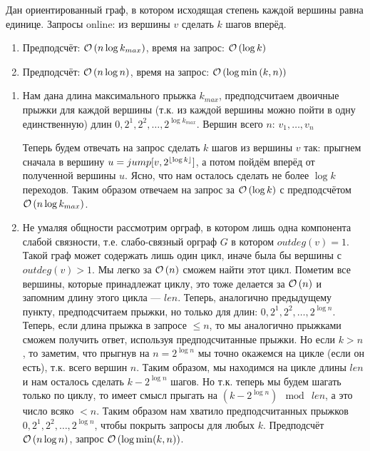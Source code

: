 \begin{task}[2]
Дан ориентированный граф, в котором исходящая степень каждой вершины равна единице. Запросы online: из вершины $v$ сделать $k$ шагов вперёд.
\begin{enumerate}[label=(\alph*)]
	\item Предподсчёт: $\mathcal{O}\left(n\log{k_{max}}\right)$, время на запрос: $\mathcal{O}\left(\log{k}\right)$
	\item Предподсчёт: $\mathcal{O}\left(n\log{n}\right)$, время на запрос: $\mathcal{O}\left(\log{\min{(k,n)}}\right)$
\end{enumerate}
\end{task}
\begin{solution}
\begin{enumerate}[label=(\alph*)]
	\item Нам дана длина максимального прыжка $k_{max}$, предподсчитаем двоичные прыжки для каждой вершины (т.к. из каждой вершины можно пойти в одну единственную) длин $0, 2^1, 2^2, \ldots, 2^{\log{k_{max}}}$. Вершин всего $n$: $v_1, \ldots, v_n$
	\begin{algorithmic}
	\EndFor
		\EndFor
	\EndFor
	\end{algorithmic}
	Теперь будем отвечать на запрос сделать $k$ шагов из вершины $v$ так: прыгнем сначала в вершину $u = jump[v, 2^{\lfloor\log{k}\rfloor}]$, а потом пойдём вперёд от полученной вершины $u$. Ясно, что нам осталось сделать не более $\log{k}$ переходов. Таким образом отвечаем на запрос за $\mathcal{O}\left(\log{k}\right)$ с предподсчётом $\mathcal{O}\left(n\log{k_{max}}\right)$.

	\item Не умаляя общности рассмотрим орграф, в котором лишь одна компонента слабой связности, т.е. слабо-связный орграф $G$ в котором $outdeg(v) = 1$. Такой граф может содержать лишь один цикл, иначе была бы вершины с $outdeg(v) > 1$. Мы легко за $\mathcal{O}\left(n\right)$ сможем найти этот цикл. Пометим все вершины, которые принадлежат циклу, это тоже делается за $\mathcal{O}\left(n\right)$ и запомним длину этого цикла --- $len$. Теперь, аналогично предыдущему пункту, предподсчитаем прыжки, но только для длин: $0, 2^1, 2^2, \ldots, 2^{\log{n}}$. Теперь, если длина прыжка в запросе $\leqslant n$, то мы аналогично прыжками сможем получить ответ, используя предподсчитанные прыжки. Но если $k > n$, то заметим, что прыгнув на $n = 2^{\log{n}}$ мы точно окажемся на цикле (если он есть), т.к. всего вершин $n$. Таким образом, мы находимся на цикле длины $len$ и нам осталось сделать $k - 2^{\log{n}}$ шагов. Но т.к. теперь мы будем шагать только по циклу, то имеет смысл прыгать на $(k - 2^{\log{n}}) \mod\ len$, а это число всяко $< n$. Таким образом нам хватило предподсчитанных прыжков $0, 2^1, 2^2, \ldots, 2^{\log{n}}$, чтобы покрыть запросы для любых $k$. Предподсчёт $\mathcal{O}\left(n\log{n}\right)$, запрос $\mathcal{O}\left(\log{\min(k,n)}\right)$.
	\end{enumerate}
\end{solution}

